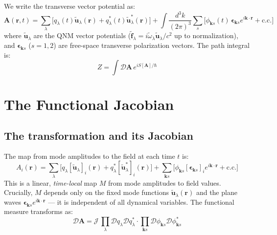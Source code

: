 \documentclass[12pt]{article}
\newcommand{\tf}{\tilde{\mathbf{f}}}
\newcommand{\tu}{\tilde{\mathbf{u}}}
\newcommand{\tomega}{\tilde{\omega}}
\begin{document}
We write the transverse vector potential as:
\begin{equation}
  \mathbf{A}(\mathbf{r},t) =
  \sum_\lambda\bigl[q_\lambda(t)\tu_\lambda(\mathbf{r})
  +q_\lambda^*(t)\tu_\lambda^*(\mathbf{r})\bigr]
  +\int\!\frac{d^3k}{(2\pi)^3}\sum_s
  \bigl[\phi_{\mathbf{k}s}(t)\,\boldsymbol{\epsilon}_{\mathbf{k}s}
  e^{i\mathbf{k}\cdot\mathbf{r}}+\mathrm{c.c.}\bigr]
  \label{eq:field_decomp}
\end{equation}
where $\tu_\lambda$ are the QNM vector potentials
($\tf_\lambda = i\tomega_\lambda\tu_\lambda/c^2$ up to normalization),
and $\boldsymbol{\epsilon}_{\mathbf{k}s}$ ($s=1,2$) are free-space
transverse polarization vectors.  The path integral is:
\begin{equation}
  Z = \int\mathcal{D}\mathbf{A}\,e^{iS[\mathbf{A}]/\hbar}
  \label{eq:path_integral}
\end{equation}

\section{The Functional Jacobian}
\label{sec:jacobian}

\subsection{The transformation and its Jacobian}

The map from mode amplitudes to the field at each time $t$ is:
\begin{equation}
  A_i(\mathbf{r}) = \sum_\lambda
  \bigl[q_\lambda[\tu_\lambda]_i(\mathbf{r})
  +q_\lambda^*[\tu_\lambda^*]_i(\mathbf{r})\bigr]
  +\sum_{\mathbf{k}s}
  \bigl[\phi_{\mathbf{k}s}[\boldsymbol{\epsilon}_{\mathbf{k}s}]_i
  e^{i\mathbf{k}\cdot\mathbf{r}}+\mathrm{c.c.}\bigr]
  \label{eq:linear_map}
\end{equation}
This is a linear, \emph{time-local} map $M$ from mode amplitudes to
field values.  Crucially, $M$ depends only on the fixed mode functions
$\tu_\lambda(\mathbf{r})$ and the plane waves
$\boldsymbol{\epsilon}_{\mathbf{k}s}e^{i\mathbf{k}\cdot\mathbf{r}}$ ---
it is independent of all dynamical variables.  The functional measure
transforms as:
\begin{equation}
  \mathcal{D}\mathbf{A} = \mathcal{J}\,
  \prod_\lambda\mathcal{D}q_\lambda\mathcal{D}q_\lambda^*\cdot
  \prod_{\mathbf{k}s}\mathcal{D}\phi_{\mathbf{k}s}\mathcal{D}\phi_{\mathbf{k}s}^*
  \label{eq:measure_transform}
\end{equation}
\end{document}
